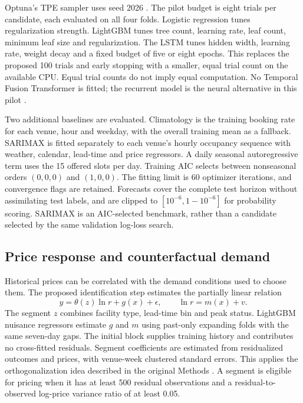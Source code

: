 Optuna's TPE sampler uses seed 2026 \cite{m30}. The pilot budget is eight trials per candidate, each evaluated on all four folds. Logistic regression tunes regularization strength. LightGBM tunes tree count, learning rate, leaf count, minimum leaf size and regularization. The LSTM tunes hidden width, learning rate, weight decay and a fixed budget of five or eight epochs. This replaces the proposed 100 trials and early stopping with a smaller, equal trial count on the available CPU. Equal trial counts do not imply equal computation. No Temporal Fusion Transformer is fitted; the recurrent model is the neural alternative in this pilot \cite{m28}.

Two additional baselines are evaluated. Climatology is the training booking rate for each venue, hour and weekday, with the overall training mean as a fallback. SARIMAX is fitted separately to each venue's hourly occupancy sequence with weather, calendar, lead-time and price regressors. A daily seasonal autoregressive term uses the 15 offered slots per day. Training AIC selects between nonseasonal orders $(0,0,0)$ and $(1,0,0)$. The fitting limit is 60 optimizer iterations, and convergence flags are retained. Forecasts cover the complete test horizon without assimilating test labels, and are clipped to $[10^{-6},1-10^{-6}]$ for probability scoring. SARIMAX is an AIC-selected benchmark, rather than a candidate selected by the same validation log-loss search.

\subsection{Price response and counterfactual demand}
Historical prices can be correlated with the demand conditions used to choose them. The proposed identification step estimates the partially linear relation
\begin{equation}
 y=\theta(z)\ln r+g(x)+\epsilon,\qquad \ln r=m(x)+v.
\end{equation}
The segment $z$ combines facility type, lead-time bin and peak status. LightGBM nuisance regressors estimate $g$ and $m$ using past-only expanding folds with the same seven-day gaps. The initial block supplies training history and contributes no cross-fitted residuals. Segment coefficients are estimated from residualized outcomes and prices, with venue-week clustered standard errors. This applies the orthogonalization idea described in the original Methods \cite{m20}. A segment is eligible for pricing when it has at least 500 residual observations and a residual-to-observed log-price variance ratio of at least 0.05.

